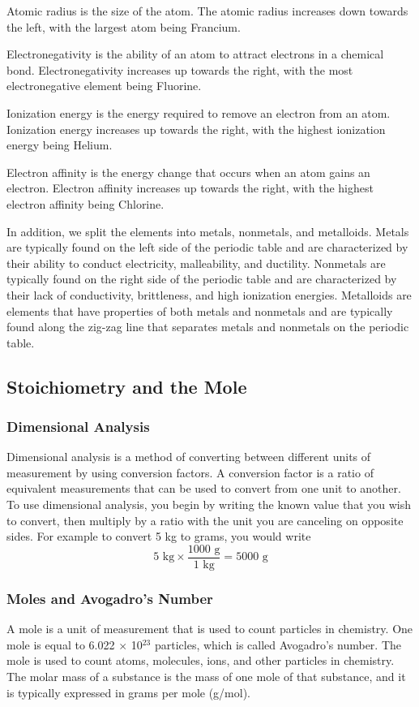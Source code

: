     Atomic radius is the size of the atom. The atomic radius increases down towards the left, with the largest atom being Francium. 

    Electronegativity is the ability of an atom to attract electrons in a chemical bond. Electronegativity increases up towards the right, with the most electronegative element being Fluorine.

    Ionization energy is the energy required to remove an electron from an atom. Ionization energy increases up towards the right, with the highest ionization energy being Helium.

    Electron affinity is the energy change that occurs when an atom gains an electron. Electron affinity increases up towards the right, with the highest electron affinity being Chlorine.

    In addition, we split the elements into metals, nonmetals, and metalloids. Metals are typically found on the left side of the periodic table and are characterized by their ability to conduct electricity, malleability, and ductility. Nonmetals are typically found on the right side of the periodic table and are characterized by their lack of conductivity, brittleness, and high ionization energies. Metalloids are elements that have properties of both metals and nonmetals and are typically found along the zig-zag line that separates metals and nonmetals on the periodic table.
    \subsection{Stoichiometry and the Mole}
        \subsubsection{Dimensional Analysis}
        Dimensional analysis is a method of converting between different units of measurement by using conversion factors. A conversion factor is a ratio of equivalent measurements that can be used to convert from one unit to another. To use dimensional analysis, you begin by writing the known value that you wish to convert, then multiply by a ratio with the unit you are canceling on opposite sides. For example to convert 5 kg to grams, you would write
\begin{equation*}
    5 \text{ kg} \times \frac{1000 \text{ g}}{1 \text{ kg}} = 5000 \text{ g}
\end{equation*}
        \subsubsection{Moles and Avogadro's Number}
        A mole is a unit of measurement that is used to count particles in chemistry. One mole is equal to 6.022 $\times$ 10$^{23}$ particles, which is called Avogadro's number. The mole is used to count atoms, molecules, ions, and other particles in chemistry. The molar mass of a substance is the mass of one mole of that substance, and it is typically expressed in grams per mole (g/mol). 
